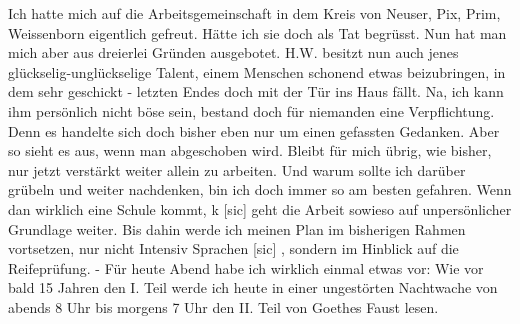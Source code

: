 \def\day{23. April 1943}
\mktitle

Ich hatte mich auf die Arbeitsgemeinschaft in dem Kreis von Neuser, Pix, Prim, Weissenborn eigentlich gefreut.
H\"{a}tte ich sie doch als Tat begr\"{u}sst.
Nun hat man mich aber aus dreierlei Gr\"{u}nden ausgebotet.
H.W. besitzt nun auch jenes gl\"{u}ckselig-ungl\"{u}ckselige Talent, einem Menschen schonend etwas beizubringen, in dem sehr geschickt - letzten Endes doch mit der T\"{u}r ins Haus f\"{a}llt.
Na, ich kann ihm pers\"{o}nlich nicht b\"{o}se sein, bestand doch f\"{u}r niemanden eine Verpflichtung.
Denn es handelte sich doch bisher eben nur um einen gefassten Gedanken.
Aber so sieht es aus, wenn man abgeschoben wird.
Bleibt f\"{u}r mich \"{u}brig, wie bisher, nur jetzt verst\"{a}rkt weiter allein zu arbeiten.
Und warum sollte ich dar\"{u}ber gr\"{u}beln und weiter nachdenken, bin ich doch immer so am besten gefahren.
Wenn dan wirklich eine Schule kommt, k{\color{red} [sic] } geht die Arbeit sowieso auf unpers\"{o}nlicher Grundlage weiter.
Bis dahin werde ich meinen Plan im bisherigen Rahmen vortsetzen, nur nicht Intensiv Sprachen{\color{red} [sic] }, sondern im Hinblick auf die Reifepr\"{u}fung.
- F\"{u}r heute Abend habe ich wirklich einmal etwas vor: Wie vor bald 15 Jahren den I. Teil werde ich heute in einer ungest\"{o}rten Nachtwache von abends 8 Uhr bis morgens 7 Uhr den II. Teil von Goethes Faust lesen.

\clearpage
